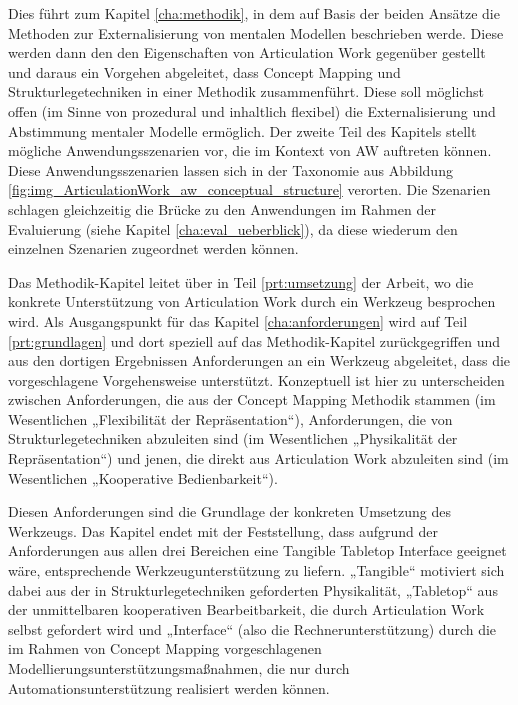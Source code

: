 Dies führt zum Kapitel \ref{cha:methodik}, in dem auf Basis der beiden Ansätze die Methoden zur Externalisierung von mentalen Modellen beschrieben werde. Diese werden dann den den Eigenschaften von Articulation Work gegenüber gestellt und daraus ein Vorgehen abgeleitet, dass Concept Mapping und Strukturlegetechniken in einer Methodik zusammenführt. Diese soll möglichst offen (im Sinne von prozedural und inhaltlich flexibel) die Externalisierung und Abstimmung mentaler Modelle ermöglich. Der zweite Teil des Kapitels stellt mögliche Anwendungsszenarien vor, die im Kontext von AW auftreten können. Diese Anwendungsszenarien lassen sich in der Taxonomie aus Abbildung \ref{fig:img_ArticulationWork_aw_conceptual_structure} verorten. Die Szenarien schlagen gleichzeitig die Brücke zu den Anwendungen im Rahmen der Evaluierung (siehe Kapitel \ref{cha:eval_ueberblick}), da diese wiederum den einzelnen Szenarien zugeordnet werden können.

Das Methodik-Kapitel leitet über in Teil \ref{prt:umsetzung} der Arbeit, wo die konkrete Unterstützung von Articulation Work durch ein Werkzeug besprochen wird. Als Ausgangspunkt für das Kapitel \ref{cha:anforderungen} wird auf Teil \ref{prt:grundlagen} und dort speziell auf das Methodik-Kapitel zurückgegriffen und  aus den dortigen Ergebnissen Anforderungen an ein Werkzeug abgeleitet, dass die vorgeschlagene Vorgehensweise unterstützt. Konzeptuell ist hier zu unterscheiden zwischen Anforderungen, die aus der Concept Mapping Methodik stammen (im Wesentlichen „Flexibilität der Repräsentation“), Anforderungen, die von Strukturlegetechniken abzuleiten sind (im Wesentlichen „Physikalität der Repräsentation“) und jenen, die direkt aus Articulation Work abzuleiten sind (im Wesentlichen „Kooperative Bedienbarkeit“).

\todo Diesen Anforderungen sind die Grundlage der konkreten Umsetzung des Werkzeugs. Das Kapitel endet mit der Feststellung, dass aufgrund der Anforderungen aus allen drei Bereichen eine Tangible Tabletop Interface geeignet wäre, entsprechende Werkzeugunterstützung zu liefern. „Tangible“ motiviert sich dabei aus der in Strukturlegetechniken geforderten Physikalität, „Tabletop“ aus der unmittelbaren kooperativen Bearbeitbarkeit, die durch Articulation Work selbst gefordert wird und „Interface“ (also die Rechnerunterstützung) durch die im Rahmen von Concept Mapping vorgeschlagenen Modellierungsunterstützungsmaßnahmen, die nur durch Automationsunterstützung realisiert werden können.

